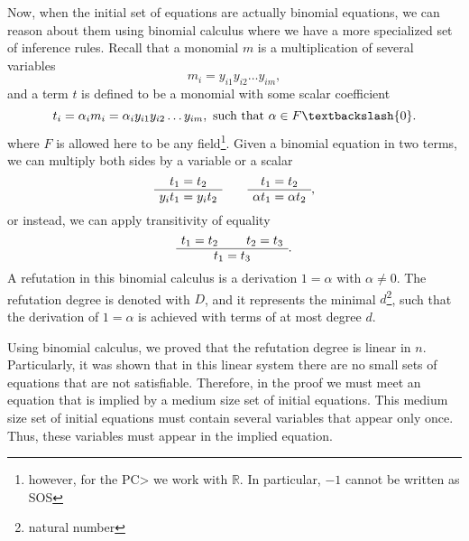 \documentclass[a4paper,twoside,justified]{tufte-handout}
\begin{document}
Now, when the initial set of equations are actually binomial equations, we can reason about them using binomial calculus where we have a more specialized set of inference rules. Recall that a monomial $m$ is a multiplication of several variables
\begin{equation*}
m_i = y_{i1} y_{i2} \dots y_{im},
\end{equation*}
and a term $t$ is defined to be a monomial with some scalar coefficient
\begin{equation*}
t_i = \alpha_i m_i = \alpha_i y_{i1} y_{i2} \dots y_{im}, \text{ such that } \alpha \in F \textbackslash \{0\}.
\end{equation*}
where $F$ is allowed here to be any field\footnote{however, for the PC> we work with $\mathbb{R}$. In particular, $-1$ cannot be written as SOS}.
Given a binomial equation in two terms, we can multiply both sides by a variable or a scalar
\begin{equation*}
\AxiomC{$t_1 = t_2$}
\UnaryInfC{$y_it_1 = y_it_2$}
\DisplayProof
\qquad
\AxiomC{$t_1 = t_2$}
\UnaryInfC{$\alpha t_1 =\alpha t_2$}
\DisplayProof,
\end{equation*}
or instead, we can apply transitivity of equality
\begin{equation*}
\AxiomC{$t_1=t_2 $}
\AxiomC{$t_2=t_3 $}
\BinaryInfC{$t_1=t_3 $}
\DisplayProof.
\end{equation*}
A refutation in this binomial calculus is a derivation $1= \alpha$ with $\alpha \neq 0$. The refutation degree is denoted  with $D$, and it represents the minimal $d$\footnote{natural number}, such that the derivation of  $1= \alpha$ is achieved with terms of at most degree $d$.

Using binomial calculus, we proved that the refutation degree is linear in $n$. Particularly, it was shown that in this linear system there are no small sets of equations that are not satisfiable. Therefore, in the proof we must meet an equation that is implied by a medium size set of initial equations. This medium size set of initial equations must contain several variables that appear only once. Thus, these variables must appear in the implied equation. 
\vspace{0.2cm}
\end{document}

